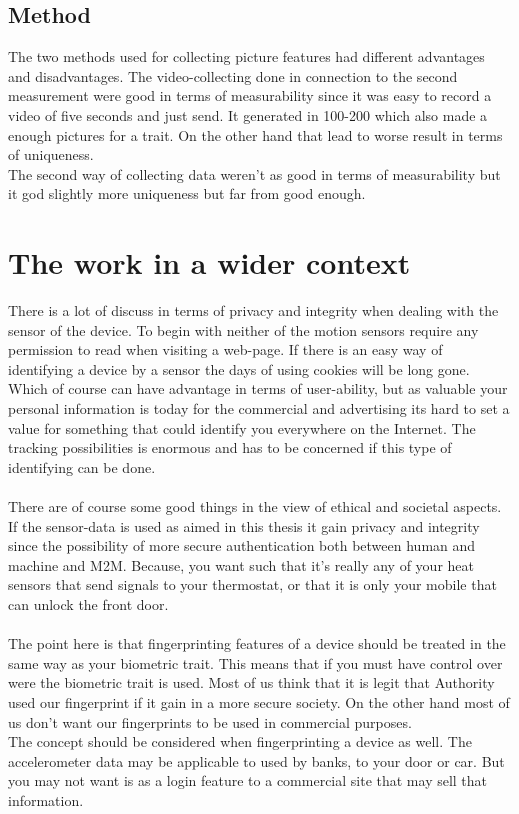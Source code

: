 \subsection{Method}
The two methods used for collecting picture features had different advantages and disadvantages. The video-collecting done in connection to the second measurement were good in terms of measurability since it was easy to record a video of five seconds and just send. It generated in 100-200 which also made a enough pictures for a trait. On the other hand that lead to worse result in terms of uniqueness. \\
The second way of collecting data weren't as good in terms of measurability but it god slightly more uniqueness but far from good enough.


\section{The work in a wider context}\label{sec:ethical}
There is a lot of discuss in terms of privacy and integrity when dealing with the sensor of the device. To begin with neither of the motion sensors require any permission to read when visiting a web-page. If there is an easy way of identifying a device by a sensor the days of using cookies will be long gone. Which of course can have advantage in terms of user-ability, but as valuable your personal information is today for the commercial and advertising its hard to set a value for something that could identify you everywhere on the Internet. The tracking possibilities is enormous and has to be concerned if this type of identifying can be done. \\
\\
There are of course some good things in the view of ethical and societal aspects. If the sensor-data is used as aimed in this thesis it gain  privacy and integrity since the possibility of more secure authentication both between human and machine and M2M. Because, you want such that it's really any of your heat sensors that send signals to your thermostat, or that it is only your mobile that can unlock the front door.\\
\\
The point here is that fingerprinting features of a device should be treated in the same way as your biometric trait. This means that if you must have control over were the biometric trait is used. Most of us think that it is legit that Authority used our fingerprint if it gain in a more secure society. On the other hand most of us don't want our fingerprints to be used in commercial purposes. \\
The concept should be considered when fingerprinting a device as well. The accelerometer data may be applicable to used by banks, to your door or car. But you may not want is as a login feature to a commercial site that may sell that information.


